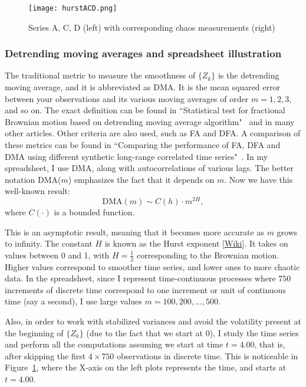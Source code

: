 \documentclass[oneside,10pt]{book}
\begin{document}
\begin{figure}%
\centering
\texttt{[image: hurstACD.png]}  %
\caption{Series A, C, D (left) with corresponding chaos measurements (right)}
\label{fig:hurst}
\end{figure}

\subsubsection{Detrending moving averages and spreadsheet illustration}

The traditional metric to measure the smoothness of $\{Z_k\}$ is the
\textcolor{index}{detrending moving average}, and it is abbreviated as DMA. It is the mean squared error between your observations and its various moving averages  of order $m = 1, 2, 3$, and so on.
The exact definition can be found in ``Statistical test for fractional Brownian motion based on detrending moving
average algorithm"~\cite{grz2018} and in many other articles. Other criteria are also used, such as FA and DFA. A comparison of these metrics can be found in ``Comparing the performance of FA, DFA and DMA using different synthetic long-range correlated time series"~\cite{ying2018}. In my spreadsheet, I use DMA, along with autocorrelations of various lags. The better notation DMA($m$)  emphasizes the fact that it depends on $m$. Now we have this well-known result:
$$
\text{DMA}(m) \sim C(h) \cdot m^{2H},
$$
where $C(\cdot)$ is a bounded function.

This is an asymptotic result, meaning that it becomes more accurate as $m$ grows to infinity.
The constant $H$ is known as the \textcolor{index}{Hurst exponent} [\href{https://en.wikipedia.org/wiki/Hurst_exponent}{Wiki}]. It takes on values between 0 and 1, with $H = \frac{1}{2}$ corresponding to the Brownian motion. Higher values correspond to smoother time series, and lower ones to more chaotic data. In the spreadsheet, since I represent time-continuous
 processes where $750$ increments of discrete time correspond to one increment or unit of continuous time (say a second), I use large values
$m=100,200,\dots, 500$.

Also, in order to work with stabilized variances and avoid the volatility present at the beginning of $\{Z_k\}$ (due to the fact that we start at 0), I study the time series and perform all the computations assuming we start at time $t=4.00$, that is,
 after skipping the first $4\times 750$ observations in discrete time. This is noticeable in Figure~\ref{fig:hurst}, where the X-axis
 on the left plots represents the time, and starts at $t=4.00$.
\end{document}

